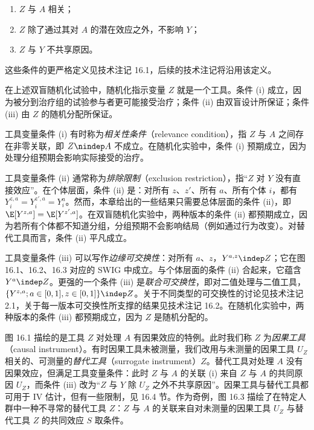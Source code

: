 \begin{enumerate}[label=(\roman*),leftmargin=2.4em,itemsep=0.15em,topsep=0.3em]
\item $Z$ 与 $A$ 相关；
\item $Z$ 除了通过其对 $A$ 的潜在效应之外，不影响 $Y$；
\item $Z$ 与 $Y$ 不共享原因。
\end{enumerate}

这些条件的更严格定义见技术注记 16.1，后续的技术注记将沿用该定义。

在上述双盲随机化试验中，随机化指示变量 $Z$ 就是一个工具。条件 (i) 成立，因为被分到治疗组的试验参与者更可能接受治疗；条件 (ii) 由双盲设计所保证；条件 (iii) 由 $Z$ 的随机分配所保证。

\begin{techpoint}[工具变量条件的正式表述]
工具变量条件 (i) 有时称为\emph{相关性条件}（relevance condition），指 $Z$ 与 $A$ 之间存在非零关联，即 $Z\nindep A$ 不成立。在随机化实验中，条件 (i) 预期成立，因为处理分组预期会影响实际接受的治疗。

工具变量条件 (ii) 通常称为\emph{排除限制}（exclusion restriction），指“$Z$ 对 $Y$ 没有直接效应”。在个体层面，条件 (ii) 是：对所有 $z$、$z'$、所有 $a$、所有个体 $i$，都有 $Y_i^{z,a}=Y_i^{z',a}=Y_i^{a}$。然而，本章给出的一些结果只需要总体层面的条件 (ii)，即 $\E[Y^{z,a}]=\E[Y^{z',a}]$。在双盲随机化实验中，两种版本的条件 (ii) 都预期成立，因为若所有个体都不知道分组，分组预期不会影响结局（例如通过行为改变）。对替代工具而言，条件 (ii) 平凡成立。

工具变量条件 (iii) 可以写作\emph{边缘可交换性}：对所有 $a$、$z$，$Y^{a,z}\indep Z$；它在图 16.1、16.2、16.3 对应的 SWIG 中成立。与个体层面的条件 (ii) 合起来，它蕴含 $Y^{a}\indep Z$。更强的一个条件 (iii) 是\emph{联合可交换性}，即对二值处理与二值工具，$\{Y^{z,a};a\in[0,1],z\in[0,1]\}\indep Z$。关于不同类型的可交换性的讨论见技术注记 2.1，关于每一版本可交换性所支撑的结果见技术注记 16.2。在随机化实验中，两种版本的条件 (iii) 都预期成立，因为 $Z$ 是随机分配的。
\end{techpoint}

图 16.1 描绘的是工具 $Z$ 对处理 $A$ 有因果效应的特例。此时我们称 $Z$ 为\emph{因果工具}（causal instrument）。有时因果工具未被测量，我们改用与未测量的因果工具 $U_Z$ 相关的、可测量的\emph{替代工具}（surrogate instrument）$Z$。替代工具对处理 $A$ 没有因果效应，但满足工具变量条件：此时 $Z$ 与 $A$ 的关联 (i) 来自 $Z$ 与 $A$ 的共同原因 $U_Z$，而条件 (iii) 改为“$Z$ 与 $Y$ 除 $U_Z$ 之外不共享原因”。因果工具与替代工具都可用于 IV 估计，但有一些限制，见 16.4 节。作为奇例，图 16.3 描绘了在特定人群中一种不寻常的替代工具 $Z$：$Z$ 与 $A$ 的关联来自对未测量的因果工具 $U_Z$ 与替代工具 $Z$ 的共同效应 $S$ 取条件。

